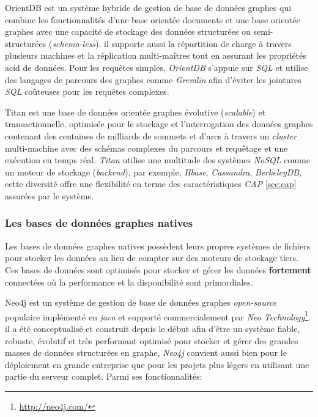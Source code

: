     \textsf{OrientDB} \cite{orientdb} est un système hybride de
    gestion de base de données graphes qui combine les fonctionnalités
    d'une base orientée documents et une base orientée graphes avec
    une capacité de stockage des données structurées ou
    semi-structurées (\emph{schema-less}). il supporte aussi la
    répartition de charge à travers plusieurs machines et la
    réplication multi-maîtres tout en assurant les propriétés
    \acrshort{acid} de données. Pour les requêtes simples,
    \emph{OrientDB} s'appuie sur \emph{SQL} et utilise des langages de
    parcours des graphes comme \emph{Gremlin} afin d'éviter les
    jointures \emph{SQL} coûteuses pour les requêtes
    complexes.\bigskip

    \textsf{Titan} \cite{titan} est une base de données orientée
    graphes évolutive (\emph{scalable}) et transactionnelle, optimisée
    pour le stockage et l'interrogation des données graphes contenant
    des centaines de milliards de sommets et d'arcs à travers un
    \emph{cluster} multi-machine avec des schémas complexes du
    parcours et requêtage et une exécution en temps réal. \emph{Titan}
    utilise une multitude des systèmes \emph{NoSQL} comme un moteur de
    stockage (\emph{backend}), par exemple, \emph{Hbase},
    \emph{Cassandra}, \emph{BerkeleyDB}, cette diversité offre une
    flexibilité en terme des caractéristiques \emph{CAP} \ref{sec:cap}
    assurées par le système.

    \subsubsection{Les bases de données graphes natives}
    \label{sec:graphdb-native}
    Les bases de données graphes natives possèdent leurs propres
    systèmes de fichiers pour stocker les données au lieu de compter
    sur des moteurs de stockage tiers. Ces bases de données sont
    optimisés pour stocker et gérer les données \textbf{fortement}
    connectées où la performance et la disponibilité sont
    primordiales.\bigskip

    \textsf{Neo4j} \cite{neo4j} est un système de gestion de base de
    données graphes \textit{open-source} populaire implémenté en
    \textit{java} et supporté commercialement par \textit{Neo
      Technology}\footnote{\url{http://neo4j.com/}}. il a été
    conceptualisé et construit depuis le début afin d'être un système
    fiable, robuste, évolutif et très performant optimisé pour stocker
    et gérer des grandes masses de données structurées en graphe,
    \textit{Neo4j} convient aussi bien pour le déploiement en grande
    entreprise que pour les projets plus légers en utilisant une
    partie du serveur complet. Parmi ses fonctionnalités:\medskip

